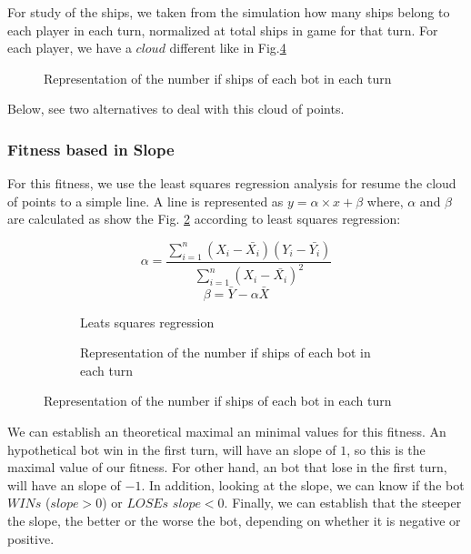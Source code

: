 \documentclass{llncs}
\begin{document}
For study of the ships, we taken from the simulation how many ships belong to each player in each turn, normalized at total ships in game for that turn. For each player, we have a {$cloud$} different like in Fig.\ref{figura:nubecita}

\begin{figure}[h]
\begin{center}
\end{center}
\caption{Representation of the number if ships of each bot in each turn} 
\label{figura:nubecita}
\end{figure}

Below, see two alternatives to deal with this cloud of points.

\subsubsection{Fitness based in Slope}

For this fitness, we use the least squares regression analysis for resume the cloud of points to a simple line. A line is represented as {$y = \alpha \times x + \beta $} where, {$\alpha$} and {$\beta$} are calculated as show the Fig. \ref{equation:LeatsSqueares} according to least squares regression:

\begin{figure}[h]
\begin{subfigure}[H]{0.4\textwidth}
    \begin{equation}
        \alpha = \frac{\sum_{i=1}^{n}(X_{i} - \bar{X_{i}})(Y_{i} - \bar{Y_{i}})}{\sum_{i=1}^{n}(X_{i} - \bar{X_{i}})^{2}}
    \end{equation}
    \begin{equation}
        \beta = \bar{Y}-\alpha\bar{X}
    \end{equation}
    \caption{Leats squares regression}
    \label{equation:LeatsSqueares}
\end{subfigure}
\begin{subfigure}[H]{0.8\textwidth}
\begin{center}
\end{center}
\caption{Representation of the number if ships of each bot in each turn} 
\label{figura:nubecita}
\end{subfigure}
\end{figure}

We can establish an theoretical maximal an minimal values for this fitness. An hypothetical bot win in the first turn, will have an slope of {$1$}, so this is the maximal value of our fitness. For other hand, an bot that lose in the first turn, will have an slope of {$-1$}. In addition, looking at the slope, we can know if the bot {$WINs$} ({$slope>0$}) or {$LOSEs$} {$slope<0$}. Finally, we can establish that the steeper the slope, the better or the worse the bot, depending on whether it is negative or positive.
\end{document}
